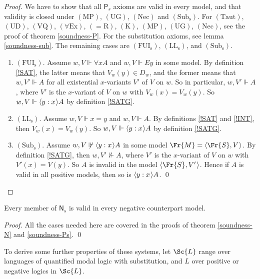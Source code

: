 \documentclass[11pt]{woarticle}
\theoremstyle{break}
\theoremstyle{nonumberplain}
\newcommand{\s}[1]{\ensuremath{\mathsf{#1}}}
\newcommand{\SAT}{\Vdash}
\newcommand{\1}{\;\,|\;\,}
\renewcommand{\t}[1]{\ensuremath{\langle #1  \makebox[.2ex]{}\rangle}}
\newcommand{\T}[1]{\ensuremath{(\mathrm{ #1})}}
\begin{document}
\begin{proof}
  We have to show that all $\s{P}_s$ axioms are valid in every model,
  and that validity is closed under \T{MP}, \T{UG}, \T{Nec} and
  \T{Sub_s}. For \T{Taut}, \T{UD}, \T{VQ}, \T{\forall Ex}, \T{=\!R},
  \T{K}, \T{MP}, \T{UG}, \T{Nec}, see the proof of theorem
  \ref{soundness-P}. For the substitution axioms, see lemma
  \ref{soundness-sub}. The remaining cases are \T{FUI_s}, \T{LL_s},
  and \T{Sub_s}.

  \begin{enumerate}

  \item \T{FUI_s}.\; Assume $w,V \SAT \forall x A$ and $w,V \SAT Ey$
    in some model. By definition \ref{!SAT}, the latter means that
    $V_w(y) \in D_w$, and the former means that $w,V' \SAT A$ for all
    existential $x$-variants $V'$ of $V$ on $w$. So in particular,
    $w,V' \SAT A$, where $V'$ is the $x$-variant of $V$ on $w$ with
    $V_w(x)=V_w(y)$. So $w,V \SAT \t{y:x}A$ by definition \ref{!SATG}.

  \item \T{LL_s}.\; Assume $w,V \SAT x\!=\!y$ and $w,V \SAT A$. By
    definitions \ref{!SAT} and \ref{!INT}, then $V_w(x) = V_w(y)$. So
    $w,V \SAT \t{y:x}A$ by definition \ref{!SATG}.

  \item \T{Sub_s}.\; Assume $w,V \not\SAT \t{y:x} A$ in some model
    $\Fr{M} = \t{\Fr{S},V}$. By definition \ref{!SATG}, then $w, V'
    \not\SAT A$, where $V'$ is the $x$-variant of $V$ on $w$ with
    $V'(x)=V(y)$. So $A$ is invalid in the model $\t{\Fr{S},
      V'}$. Hence if $A$ is valid in all positive models, then so is
    $\t{y:x}A$. \qed

  \end{enumerate}
\end{proof}

\begin{theorem}[Soundness of $\s{N}_s$]\label{soundness-Ns}
  Every member of $\s{N}_s$ is valid in every negative counterpart
  model.
\end{theorem}

\begin{proof}
  All the cases needed here are covered in the proofs of theorem
  \ref{soundness-N} and \ref{soundness-Ps}. \qed
\end{proof}

To derive some further properties of these systems, let $\Sc{L}$ range
over languages of quantified modal logic with substitution, and $L$
over positive or negative logics in $\Sc{L}$.
\end{document}
